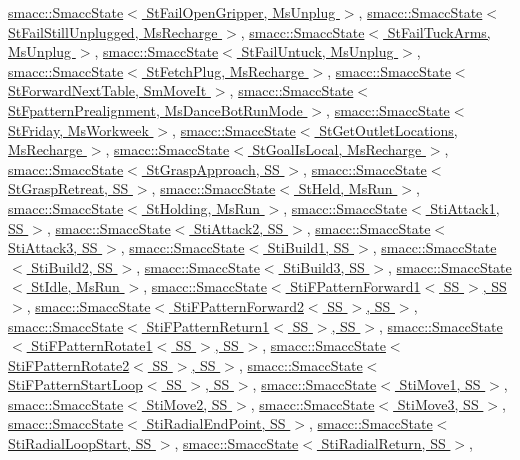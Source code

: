 \hyperlink{classsmacc_1_1SmaccState}{smacc\+::\+Smacc\+State$<$ St\+Fail\+Open\+Gripper, Ms\+Unplug $>$}, \hyperlink{classsmacc_1_1SmaccState}{smacc\+::\+Smacc\+State$<$ St\+Fail\+Still\+Unplugged, Ms\+Recharge $>$}, \hyperlink{classsmacc_1_1SmaccState}{smacc\+::\+Smacc\+State$<$ St\+Fail\+Tuck\+Arms, Ms\+Unplug $>$}, \hyperlink{classsmacc_1_1SmaccState}{smacc\+::\+Smacc\+State$<$ St\+Fail\+Untuck, Ms\+Unplug $>$}, \hyperlink{classsmacc_1_1SmaccState}{smacc\+::\+Smacc\+State$<$ St\+Fetch\+Plug, Ms\+Recharge $>$}, \hyperlink{classsmacc_1_1SmaccState}{smacc\+::\+Smacc\+State$<$ St\+Forward\+Next\+Table, Sm\+Move\+It $>$}, \hyperlink{classsmacc_1_1SmaccState}{smacc\+::\+Smacc\+State$<$ St\+Fpattern\+Prealignment, Ms\+Dance\+Bot\+Run\+Mode $>$}, \hyperlink{classsmacc_1_1SmaccState}{smacc\+::\+Smacc\+State$<$ St\+Friday, Ms\+Workweek $>$}, \hyperlink{classsmacc_1_1SmaccState}{smacc\+::\+Smacc\+State$<$ St\+Get\+Outlet\+Locations, Ms\+Recharge $>$}, \hyperlink{classsmacc_1_1SmaccState}{smacc\+::\+Smacc\+State$<$ St\+Goal\+Is\+Local, Ms\+Recharge $>$}, \hyperlink{classsmacc_1_1SmaccState}{smacc\+::\+Smacc\+State$<$ St\+Grasp\+Approach, S\+S $>$}, \hyperlink{classsmacc_1_1SmaccState}{smacc\+::\+Smacc\+State$<$ St\+Grasp\+Retreat, S\+S $>$}, \hyperlink{classsmacc_1_1SmaccState}{smacc\+::\+Smacc\+State$<$ St\+Held, Ms\+Run $>$}, \hyperlink{classsmacc_1_1SmaccState}{smacc\+::\+Smacc\+State$<$ St\+Holding, Ms\+Run $>$}, \hyperlink{classsmacc_1_1SmaccState}{smacc\+::\+Smacc\+State$<$ Sti\+Attack1, S\+S $>$}, \hyperlink{classsmacc_1_1SmaccState}{smacc\+::\+Smacc\+State$<$ Sti\+Attack2, S\+S $>$}, \hyperlink{classsmacc_1_1SmaccState}{smacc\+::\+Smacc\+State$<$ Sti\+Attack3, S\+S $>$}, \hyperlink{classsmacc_1_1SmaccState}{smacc\+::\+Smacc\+State$<$ Sti\+Build1, S\+S $>$}, \hyperlink{classsmacc_1_1SmaccState}{smacc\+::\+Smacc\+State$<$ Sti\+Build2, S\+S $>$}, \hyperlink{classsmacc_1_1SmaccState}{smacc\+::\+Smacc\+State$<$ Sti\+Build3, S\+S $>$}, \hyperlink{classsmacc_1_1SmaccState}{smacc\+::\+Smacc\+State$<$ St\+Idle, Ms\+Run $>$}, \hyperlink{classsmacc_1_1SmaccState}{smacc\+::\+Smacc\+State$<$ Sti\+F\+Pattern\+Forward1$<$ S\+S $>$, S\+S $>$}, \hyperlink{classsmacc_1_1SmaccState}{smacc\+::\+Smacc\+State$<$ Sti\+F\+Pattern\+Forward2$<$ S\+S $>$, S\+S $>$}, \hyperlink{classsmacc_1_1SmaccState}{smacc\+::\+Smacc\+State$<$ Sti\+F\+Pattern\+Return1$<$ S\+S $>$, S\+S $>$}, \hyperlink{classsmacc_1_1SmaccState}{smacc\+::\+Smacc\+State$<$ Sti\+F\+Pattern\+Rotate1$<$ S\+S $>$, S\+S $>$}, \hyperlink{classsmacc_1_1SmaccState}{smacc\+::\+Smacc\+State$<$ Sti\+F\+Pattern\+Rotate2$<$ S\+S $>$, S\+S $>$}, \hyperlink{classsmacc_1_1SmaccState}{smacc\+::\+Smacc\+State$<$ Sti\+F\+Pattern\+Start\+Loop$<$ S\+S $>$, S\+S $>$}, \hyperlink{classsmacc_1_1SmaccState}{smacc\+::\+Smacc\+State$<$ Sti\+Move1, S\+S $>$}, \hyperlink{classsmacc_1_1SmaccState}{smacc\+::\+Smacc\+State$<$ Sti\+Move2, S\+S $>$}, \hyperlink{classsmacc_1_1SmaccState}{smacc\+::\+Smacc\+State$<$ Sti\+Move3, S\+S $>$}, \hyperlink{classsmacc_1_1SmaccState}{smacc\+::\+Smacc\+State$<$ Sti\+Radial\+End\+Point, S\+S $>$}, \hyperlink{classsmacc_1_1SmaccState}{smacc\+::\+Smacc\+State$<$ Sti\+Radial\+Loop\+Start, S\+S $>$}, \hyperlink{classsmacc_1_1SmaccState}{smacc\+::\+Smacc\+State$<$ Sti\+Radial\+Return, S\+S $>$}, 